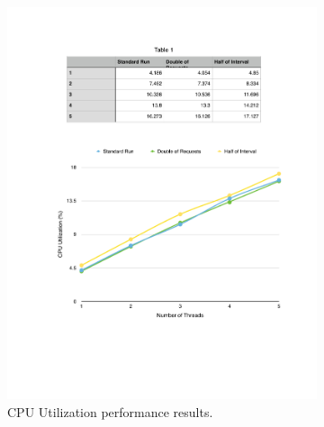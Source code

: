 \begin{figure}[ht!]
\centering
\begin{subfigure}{.5\textwidth}
  \centering
  \includegraphics[width=\linewidth]{./images/cpu_3_lap}
  \caption{CPU Utilization performance results.}
  \label{fig:eval_3laps_cpu}
\end{subfigure}%
\begin{subfigure}{.5\textwidth}
  \centering

\end{subfigure}
\end{figure}
